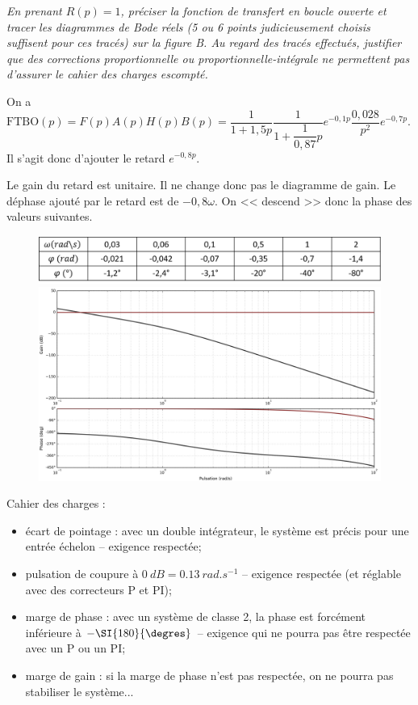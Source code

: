 \question{\label{q_16}}\textit{En prenant $R(p) = 1$, préciser la fonction de transfert en boucle ouverte et tracer les diagrammes de
Bode réels (5 ou 6 points judicieusement choisis suffisent pour ces tracés) sur la figure B. Au regard des tracés
effectués, justifier que des corrections proportionnelle ou proportionnelle-intégrale ne permettent pas d’assurer
le cahier des charges escompté.}
\ifprof
\begin{corrige}
On a $\text{FTBO}(p)=F(p)A(p)H(p)B(p)=\dfrac{1}{1 + 1,5p} \dfrac{1}{1+\dfrac{1}{0,87}p}e^{-0,1 p}  \dfrac{0,028}{p^2} e^{-0,7p}$. Il s'agit donc d'ajouter le retard $e^{-0,8 p}$.

Le gain du retard est unitaire. Il ne change donc pas le diagramme de gain.
Le déphase ajouté par le retard est de $-0,8\omega $. 
On << descend >> donc la phase des valeurs suivantes. 

\begin{figure}[H]
\centering
\includegraphics[width=.8\linewidth]{images/cor_q16}
\includegraphics[width=.8\linewidth]{images/cor_q16_bode}
\end{figure}

Cahier des charges :
\begin{itemize}
\item écart de pointage : avec un double intégrateur, le système est précis pour une entrée échelon -- exigence respectée;
\item pulsation de coupure à $\SI{0}{dB}= \SI{0,13}{rad.s^{-1}}$ -- exigence respectée (et réglable avec des correcteurs P et PI);
\item marge de phase : avec un système de classe 2, la phase est forcément inférieure à $-\SI{180}{\degres}$ -- exigence qui ne pourra pas être respectée avec un P ou un PI;
\item marge de gain : si la marge de phase n'est pas respectée, on ne pourra pas stabiliser le système...
\end{itemize}

\end{corrige}
\else
\fi


